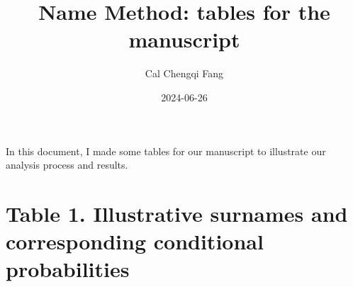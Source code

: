 \documentclass[
  landscape]{article}
\title{Name Method: tables for the manuscript}
\author{Cal Chengqi Fang}
\date{2024-06-26}
\begin{document}
\maketitle

In this document, I made some tables for our manuscript to illustrate
our analysis process and results.

\newpage

\hypertarget{table-1.-illustrative-surnames-and-corresponding-conditional-probabilities}{%
\section{Table 1. Illustrative surnames and corresponding conditional
probabilities}\label{table-1.-illustrative-surnames-and-corresponding-conditional-probabilities}}
\end{document}
